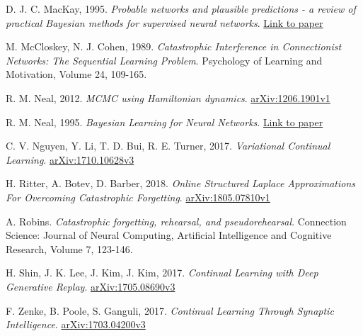 \documentclass[a4paper,10pt]{article}
\begin{document}
\begin{thebibliography}{8}

 D. J. C. MacKay, 1995. \textit{Probable networks and plausible predictions - a review of practical Bayesian methods for supervised neural networks}. \href{https://citeseerx.ist.psu.edu/viewdoc/download;jsessionid=F4F7C99DECF23AEDF5BAAF5E25DE86F9?doi=10.1.1.136.4011&rep=rep1&type=pdf}{Link to paper}

 M. McCloskey, N. J. Cohen, 1989. \textit{Catastrophic Interference in Connectionist Networks: The Sequential Learning Problem}. Psychology of Learning and Motivation, Volume 24, 109-165.

 R. M. Neal, 2012. \textit{MCMC using Hamiltonian dynamics}. \href{https://arxiv.org/abs/1206.1901}{arXiv:1206.1901v1}

 R. M. Neal, 1995. \textit{Bayesian Learning for Neural Networks}. \href{http://citeseerx.ist.psu.edu/viewdoc/download?doi=10.1.1.446.9306&rep=rep1&type=pdf}{Link to paper}

 C. V. Nguyen, Y. Li, T. D. Bui, R. E. Turner, 2017. \textit{Variational Continual Learning}. \href{https://arxiv.org/abs/1710.10628}{arXiv:1710.10628v3}


 H. Ritter, A. Botev, D. Barber, 2018. \textit{Online Structured Laplace Approximations For Overcoming Catastrophic Forgetting}. \href{https://arxiv.org/abs/1805.07810}{arXiv:1805.07810v1}

 A. Robins. \textit{Catastrophic forgetting, rehearsal, and pseudorehearsal}. Connection Science: Journal of Neural Computing, Artificial Intelligence and Cognitive Research, Volume 7, 123-146.

 H. Shin, J. K. Lee, J. Kim, J. Kim, 2017. \textit{Continual Learning with Deep Generative Replay}. \href{https://arxiv.org/abs/1705.08690}{arXiv:1705.08690v3}

 F. Zenke, B. Poole, S. Ganguli, 2017. \textit{Continual Learning Through Synaptic Intelligence}. \href{https://arxiv.org/abs/1703.04200}{arXiv:1703.04200v3}




\end{thebibliography}
\end{document}
